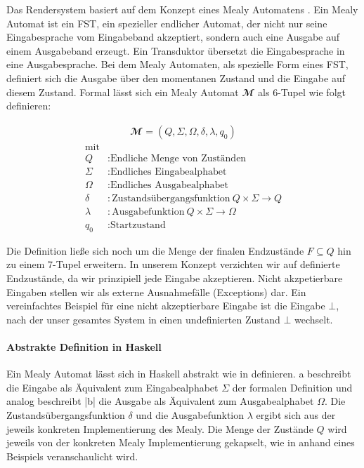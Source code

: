 Das Rendersystem basiert auf dem Konzept eines Mealy Automatens \parencite{Mealy1955}. Ein Mealy Automat ist ein \acl{FST}, ein spezieller endlicher Automat, der nicht nur seine Eingabesprache vom Eingabeband akzeptiert, sondern auch eine Ausgabe auf einem Ausgabeband erzeugt. Ein Transduktor übersetzt die Eingabesprache in eine Ausgabesprache. Bei dem Mealy Automaten, als spezielle Form eines \ac{FST}, definiert sich die Ausgabe über den momentanen Zustand und die Eingabe auf diesem Zustand. Formal lässt sich ein Mealy Automat $\mathbfcal{M}$ als 6-Tupel wie folgt definieren:

\begin{definition}
\begin{align}
\mathbfcal{M} = \left( Q, \Sigma, \Omega, \delta, \lambda, q_0 \right)
\label{def:mealy-formal}
\end{align}
\begin{align*}
	\text{mit}\\
	Q &: \text{Endliche Menge von Zuständen} \\
	\Sigma  &:\text{Endliches Eingabealphabet} \\
	\Omega  &:\text{Endliches Ausgabealphabet} \\
	\delta  &:\text{Zustandsübergangsfunktion}\ Q \times \Sigma \rightarrow Q \\
	\lambda &:\text{Ausgabefunktion}\ Q \times \Sigma \rightarrow \Omega \\
	q_0 &: \text{Startzustand}
\end{align*}
\end{definition}

Die Definition ließe sich noch um die Menge der finalen Endzustände $F \subseteq Q$ hin zu einem 7-Tupel erweitern. In unserem Konzept verzichten wir auf definierte Endzustände, da wir prinzipiell jede Eingabe akzeptieren. Nicht akzpetierbare Eingaben stellen wir als externe Ausnahmefälle (Exceptions) dar. Ein vereinfachtes Beispiel für eine nicht akzeptierbare Eingabe ist die Eingabe $\bot$, nach der unser gesamtes System in einen undefinierten Zustand $\bot$ wechselt.

\paragraph{Abstrakte Definition in Haskell}
\label{sec:abstrakte-definition-haskell}

Ein Mealy Automat lässt sich in Haskell abstrakt wie in  definieren. {\ttfamily a} beschreibt die Eingabe als Äquivalent zum Eingabealphabet $\Sigma$ der formalen Definition und analog beschreibt |b| die Ausgabe als Äquivalent zum Ausgabealphabet $\Omega$. Die Zustandsübergangsfunktion $\delta$ und die Ausgabefunktion $\lambda$ ergibt sich aus der jeweils konkreten Implementierung des Mealy. Die Menge der Zustände $Q$ wird jeweils von der konkreten Mealy Implementierung gekapselt, wie in  anhand eines Beispiels veranschaulicht wird.

